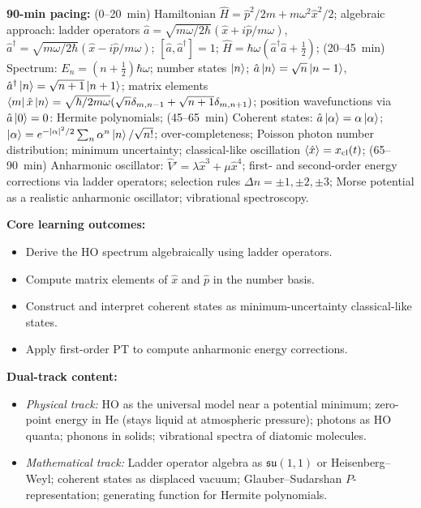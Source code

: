 \documentclass[11pt,a4paper]{article}
\begin{document}
\begin{tcolorbox}[modulebox, title={Module~I.4 / L03: The Harmonic Oscillator}]
\textbf{90-min pacing:} (0--20~min) Hamiltonian $\hat{H}=\hat{p}^2/2m+m\omega^2\hat{x}^2/2$;
algebraic approach: ladder operators $\hat{a}=\sqrt{m\omega/2\hbar}(\hat{x}+i\hat{p}/m\omega)$,
$\hat{a}^\dagger=\sqrt{m\omega/2\hbar}(\hat{x}-i\hat{p}/m\omega)$;
$[\hat{a},\hat{a}^\dagger]=1$; $\hat{H}=\hbar\omega(\hat{a}^\dagger\hat{a}+\tfrac{1}{2})$;
(20--45~min) Spectrum: $E_n=(n+\tfrac{1}{2})\hbar\omega$; number states $\ket{n}$;
$\hat{a}\ket{n}=\sqrt{n}\ket{n-1}$, $\hat{a}^\dagger\ket{n}=\sqrt{n+1}\ket{n+1}$;
matrix elements $\bra{m}\hat{x}\ket{n}=\sqrt{\hbar/2m\omega}(\sqrt{n}\delta_{m,n-1}+\sqrt{n+1}\delta_{m,n+1})$;
position wavefunctions via $\hat{a}\ket{0}=0$: Hermite polynomials;
(45--65~min) Coherent states: $\hat{a}\ket{\alpha}=\alpha\ket{\alpha}$;
$\ket{\alpha}=e^{-|\alpha|^2/2}\sum_n\alpha^n\ket{n}/\sqrt{n!}$; over-completeness;
Poisson photon number distribution; minimum uncertainty; classical-like oscillation $\langle\hat{x}\rangle=x_{\rm cl}(t)$;
(65--90~min) Anharmonic oscillator: $\hat{V}'=\lambda\hat{x}^3+\mu\hat{x}^4$;
first- and second-order energy corrections via ladder operators; selection rules $\Delta n=\pm1,\pm2,\pm3$;
Morse potential as a realistic anharmonic oscillator; vibrational spectroscopy.

\medskip\textbf{Core learning outcomes:}
\begin{itemize}[leftmargin=1.4em,topsep=2pt,itemsep=1pt]
  \item Derive the HO spectrum algebraically using ladder operators.
  \item Compute matrix elements of $\hat{x}$ and $\hat{p}$ in the number basis.
  \item Construct and interpret coherent states as minimum-uncertainty classical-like states.
  \item Apply first-order PT to compute anharmonic energy corrections.
\end{itemize}

\medskip\textbf{Dual-track content:}
\begin{itemize}[leftmargin=1.4em,topsep=2pt,itemsep=1pt]
  \item \textit{Physical track:} HO as the universal model near a potential minimum;
    zero-point energy in He (stays liquid at atmospheric pressure);
    photons as HO quanta; phonons in solids; vibrational spectra of diatomic molecules.
  \item \textit{Mathematical track:} Ladder operator algebra as $\mathfrak{su}(1,1)$ or Heisenberg--Weyl;
    coherent states as displaced vacuum; Glauber--Sudarshan $P$-representation;
    generating function for Hermite polynomials.
\end{itemize}


\end{tcolorbox}
\end{document}
